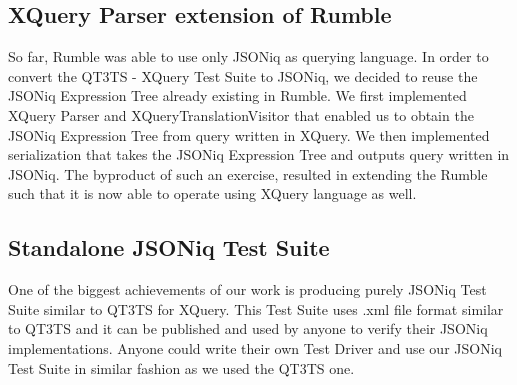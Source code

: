\subsection{XQuery Parser extension of Rumble}
So far, Rumble was able to use only JSONiq as querying language. In order to convert the QT3TS - XQuery Test Suite to JSONiq, we decided to reuse the JSONiq Expression Tree already existing in Rumble. We first implemented XQuery Parser and XQueryTranslationVisitor that enabled us to obtain the JSONiq Expression Tree from query written in XQuery. We then implemented serialization that takes the JSONiq Expression Tree and outputs query written in JSONiq. The byproduct of such an exercise, resulted in extending the Rumble such that it is now able to operate using XQuery language as well.

\subsection{Standalone JSONiq Test Suite}
One of the biggest achievements of our work is producing purely JSONiq Test Suite similar to QT3TS for XQuery. This Test Suite uses .xml file format similar to QT3TS and it can be published and used by anyone to verify their JSONiq implementations. Anyone could write their own Test Driver and use our JSONiq Test Suite in similar fashion as we used the QT3TS one.

